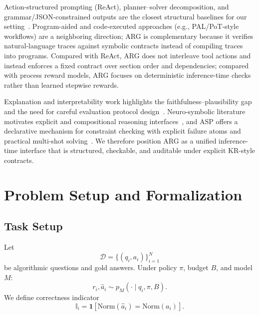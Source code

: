 \documentclass{article}
\begin{document}
Action-structured prompting (ReAct), planner--solver decomposition, and grammar/JSON-constrained outputs are the closest structural baselines for our setting~\cite{yao2022react,wang2023plan,geng2023grammar}. Program-aided and code-executed approaches (e.g., PAL/PoT-style workflows) are a neighboring direction; ARG is complementary because it verifies natural-language traces against symbolic contracts instead of compiling traces into programs. Compared with ReAct, ARG does not interleave tool actions and instead enforces a fixed contract over section order and dependencies; compared with process reward models, ARG focuses on deterministic inference-time checks rather than learned stepwise rewards.

Explanation and interpretability work highlights the faithfulness--plausibility gap and the need for careful evaluation protocol design~\cite{jacovi2020towards,lyu2024towards,matton2025walk,ribeiro2016should,doshi2017towards,lipton2018mythos}. Neuro-symbolic literature motivates explicit and compositional reasoning interfaces~\cite{garcez2023neurosymbolic,hitzler2022neural,delong2024neurosymbolic}, and ASP offers a declarative mechanism for constraint checking with explicit failure atoms and practical multi-shot solving~\cite{brewka2011answer,gebser2019multi}. We therefore position ARG as a unified inference-time interface that is structured, checkable, and auditable under explicit KR-style contracts.

\section{Problem Setup and Formalization}
\subsection{Task Setup}
Let
\begin{equation}
\label{eq:dataset}
\mathcal{D}=\{(q_i,a_i)\}_{i=1}^{N}
\end{equation}
be algorithmic questions and gold answers. Under policy \(\pi\), budget \(B\), and model \(M\):
\begin{equation}
\label{eq:trace-sampling}
r_i,\hat a_i \sim p_M(\cdot\mid q_i,\pi,B).
\end{equation}
We define correctness indicator
\begin{equation}
\label{eq:correctness-indicator}
\mathbb{I}_i = \mathbf{1}[\mathrm{Norm}(\hat a_i)=\mathrm{Norm}(a_i)].
\end{equation}
\end{document}

